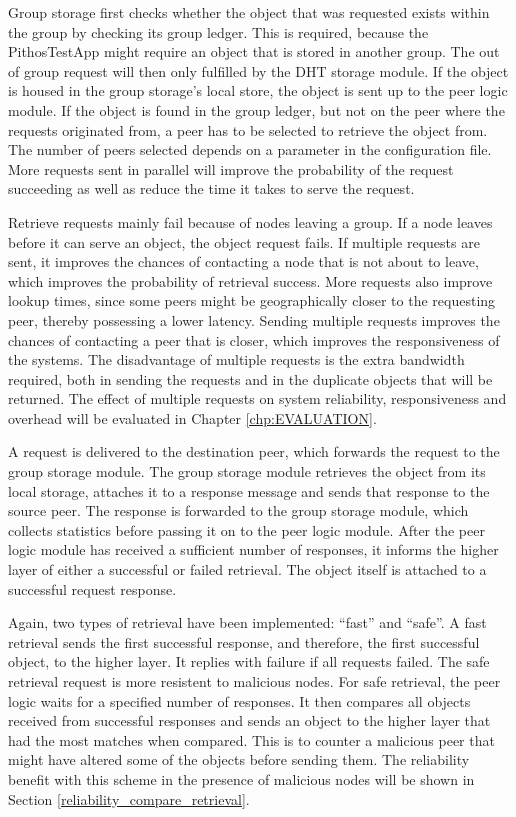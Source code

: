     Group storage first checks whether the object that was requested exists within the group by checking its group ledger. This is required, because the PithosTestApp might require an object that is stored in another group. The out of group request will then only fulfilled by the DHT storage module. If the object is housed in the group storage's local store, the object is sent up to the peer logic module. If the object is found in the group ledger, but not on the peer where the requests originated from, a peer has to be selected to retrieve the object from. The number of peers selected depends on a parameter in the configuration file. More requests sent in parallel will improve the probability of the request succeeding as well as reduce the time it takes to serve the request.

    Retrieve requests mainly fail because of nodes leaving a group. If a node leaves before it can serve an object, the object request fails. If multiple requests are sent, it improves the chances of contacting a node that is not about to leave, which improves the probability of retrieval success. More requests also improve lookup times, since some peers might be geographically closer to the requesting peer, thereby possessing a lower latency. Sending multiple requests improves the chances of contacting a peer that is closer, which improves the responsiveness of the systems. The disadvantage of multiple requests is the extra bandwidth required, both in sending the requests and in the duplicate objects that will be returned. The effect of multiple requests on system reliability, responsiveness and overhead will be evaluated in Chapter \ref{chp:EVALUATION}.

    A request is delivered to the destination peer, which forwards the request to the group storage module. The group storage module retrieves the object from its local storage, attaches it to a response message and sends that response to the source peer. The response is forwarded to the group storage module, which collects statistics before passing it on to the peer logic module. After the peer logic module has received a sufficient number of responses, it informs the higher layer of either a successful or failed retrieval. The object itself is attached to a successful request response.

    Again, two types of retrieval have been implemented: ``fast'' and ``safe''. A fast retrieval sends the first successful response, and therefore, the first successful object, to the higher layer. It replies with failure if all requests failed. The safe retrieval request is more resistent to malicious nodes. For safe retrieval, the peer logic waits for a specified number of responses. It then compares all objects received from successful responses and sends an object to the higher layer that had the most matches when compared. This is to counter a malicious peer that might have altered some of the objects before sending them. The reliability benefit with this scheme in the presence of malicious nodes will be shown in Section \ref{reliability_compare_retrieval}.

